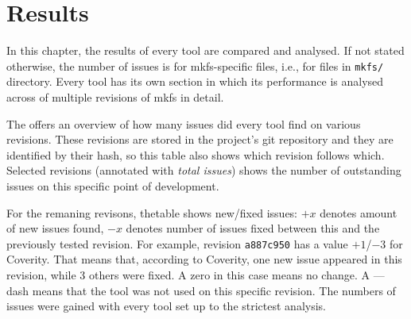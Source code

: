 
\chapter{Results}\label{chap:results}

In this chapter, the results of every tool are compared and analysed. If not
stated otherwise, the number of issues is for mkfs-specific files, i.e., for
files in {\tt mkfs/} directory. Every tool has its own section in which its performance is analysed across of multiple revisions of mkfs in detail.

The  offers an overview of how many issues did every
tool find on various revisions. These revisions are stored in the project's git
repository and they are identified by their hash, so this table also shows
which revision follows which.  Selected revisions (annotated with {\em total
issues}) shows the number of outstanding issues on this specific point of
development.

For the remaning revisons, thetable shows new/fixed issues: $+x$ denotes amount
of new issues found, $-x$ denotes number of issues fixed between this and the
previously tested revision. For example, revision {\tt a887c950} has a value
$+1$/$-3$ for Coverity. That means that, according to Coverity, one new issue
appeared in this revision, while 3 others were fixed. A zero in this case means
no change.  A --- dash means that the tool was not used on this specific
revision.  The numbers of issues were gained with every tool set up to the
strictest analysis.

